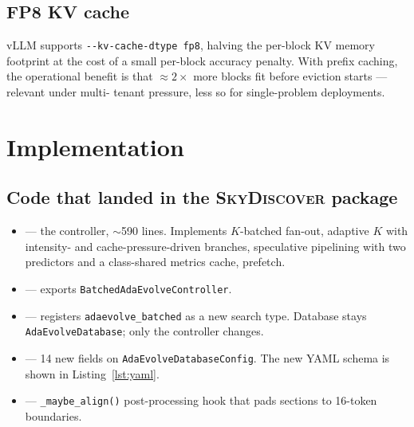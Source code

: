\documentclass[11pt]{article}
\newcommand{\skyd}{\textsc{SkyDiscover}}
\newcommand{\bcontroller}{\texttt{BatchedAdaEvolveController}}
\begin{document}
\subsection{FP8 KV cache}

vLLM supports \verb|--kv-cache-dtype fp8|, halving the per-block KV
memory footprint at the cost of a small per-block accuracy penalty.
With prefix caching, the operational benefit is that $\approx 2\times$
more blocks fit before eviction starts --- relevant under multi-
tenant pressure, less so for single-problem deployments.

\section{Implementation}
\label{sec:implementation}

\subsection{Code that landed in the \skyd{} package}

\begin{itemize}
\item {} ---
  the controller, $\sim$590 lines. Implements $K$-batched fan-out,
  adaptive $K$ with intensity- and cache-pressure-driven branches,
  speculative pipelining with two predictors and a class-shared
  metrics cache, prefetch.
\item {} --- exports
  \bcontroller{}.
\item {} --- registers
  \verb|adaevolve_batched| as a new search type. Database stays
  \verb|AdaEvolveDatabase|; only the controller changes.
\item {} --- 14 new fields on
  \verb|AdaEvolveDatabaseConfig|. The new YAML schema is shown in
  Listing~\ref{lst:yaml}.
\item {} ---
  \verb|_maybe_align()| post-processing hook that pads sections to
  16-token boundaries.
\end{itemize}
\end{document}
